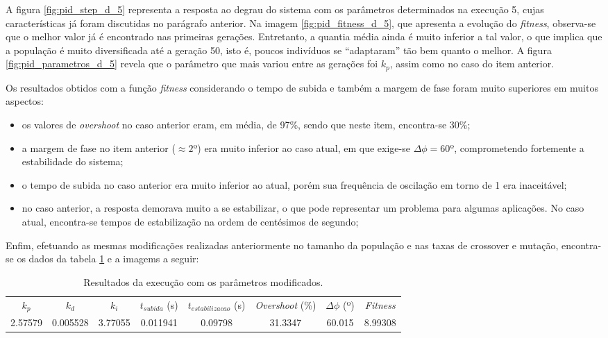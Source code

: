 \begin {enumerate}
	\FloatBarrier
	
	A figura \ref{fig:pid_step_d_5} representa a resposta ao degrau do sistema com
	os parâmetros determinados na execução 5, cujas características já foram
	discutidas no parágrafo anterior. Na imagem \ref{fig:pid_fitness_d_5}, que
	apresenta a evolução do \textit{fitness}, observa-se que o melhor valor já é
	encontrado nas primeiras gerações. Entretanto, a quantia média ainda é muito
	inferior a tal valor, o que implica que a população é muito diversificada até a
	geração 50, isto é, poucos indivíduos se ``adaptaram'' tão bem quanto o
	melhor. A figura \ref{fig:pid_parametros_d_5} revela que o parâmetro que mais
	variou entre as gerações foi \(k_p\), assim como no caso do item anterior.
	
	\vspace{12pt}
	
	Os resultados obtidos com a função \textit{fitness} considerando
	o tempo de subida e também a margem de fase foram muito superiores em muitos
	aspectos:
	
	\begin{itemize}
		\item os valores de \textit{overshoot} no caso anterior eram, em média,
		de 97\%, sendo que neste item, encontra-se 30\%;
		
		\item a margem de fase no item anterior (\(\approx 2º\)) era muito inferior ao
		caso atual, em que exige-se \(\Delta \phi = 60º\), comprometendo fortemente a
		estabilidade do sistema;
	
		\item o tempo de subida no caso anterior era muito inferior ao atual, porém sua
		frequência de oscilação em torno de 1 era inaceitável;
	 
		\item no caso anterior, a resposta demorava muito a se estabilizar, o que pode
		representar um problema para algumas aplicações. No caso atual, encontra-se
		tempos de estabilização na ordem de centésimos de segundo;
	
	\end{itemize} 
	
	Enfim, efetuando as mesmas modificações realizadas anteriormente no tamanho da
	população e nas taxas de crossover e mutação, encontra-se os dados da tabela
	\ref{tab:pid_d_mod} e a imagems a seguir:
	
	\begin{table}[h]
	    \centering
		\caption{\label{tab:pid_d_mod} Resultados da execução com os parâmetros
		modificados.}
		\begin{tabular}{| c | c | c | c | c | c | c | c |} 
			\hline
			\(k_p\) & \(k_d\) & \(k_i\) &
			\(t_{subida} \) (s) & \(t_{estabilizacao}\) (s) & \textit{Overshoot} (\%) &
			\(\Delta \phi\) (º)& \textit{Fitness}\\ \hhline{|=|=|=|=|=|=|=|=|}
			2.57579 & 0.005528 & 3.77055 & 0.011941 & 0.09798 &  31.3347  &
			60.015 & 8.99308\\ \hline 
		\end{tabular}	    
    \end{table}
	

\end{enumerate}
